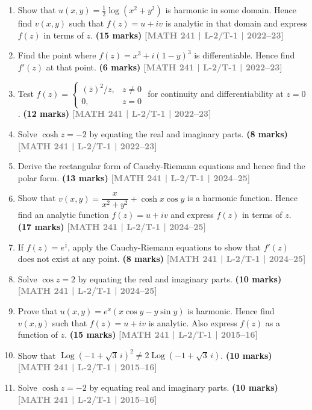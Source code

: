 \documentclass[12pt,a4paper]{article}
\newcommand{\yr}[1]{\hfill\textcolor{gray}{\small\textbf{[#1]}}}
\newcommand{\mk}[1]{\textcolor{orange!70!black}{\small\textbf{(#1 marks)}}}
\begin{document}
\begin{enumerate}
\item Show that $u(x,y)=\tfrac{1}{2}\log(x^{2}+y^{2})$ is harmonic in some domain. Hence find $v(x,y)$ such that $f(z)=u+iv$ is analytic in that domain and express $f(z)$ in terms of $z$.
\mk{15} \yr{MATH 241 | L-2/T-1 | 2022--23}

\item Find the point where $f(z)=x^{3}+i(1-y)^{3}$ is differentiable. Hence find $f'(z)$ at that point.
\mk{6} \yr{MATH 241 | L-2/T-1 | 2022--23}

\item Test $f(z)=\begin{cases}(\bar{z})^{2}/z, & z\neq 0\\ 0, & z=0\end{cases}$ for continuity and differentiability at $z=0$.
\mk{12} \yr{MATH 241 | L-2/T-1 | 2022--23}

\item Solve $\cosh z=-2$ by equating the real and imaginary parts.
\mk{8} \yr{MATH 241 | L-2/T-1 | 2022--23}

\item Derive the rectangular form of Cauchy-Riemann equations and hence find the polar form.
\mk{13} \yr{MATH 241 | L-2/T-1 | 2024--25}

\item Show that $v(x,y)=\dfrac{x}{x^{2}+y^{2}}+\cosh x\cos y$ is a harmonic function. Hence find an analytic function $f(z)=u+iv$ and express $f(z)$ in terms of $z$.
\mk{17} \yr{MATH 241 | L-2/T-1 | 2024--25}

\item If $f(z)=e^{\bar{z}}$, apply the Cauchy-Riemann equations to show that $f'(z)$ does not exist at any point.
\mk{8} \yr{MATH 241 | L-2/T-1 | 2024--25}

\item Solve $\cos z=2$ by equating the real and imaginary parts.
\mk{10} \yr{MATH 241 | L-2/T-1 | 2024--25}

\item Prove that $u(x,y)=e^{x}(x\cos y - y\sin y)$ is harmonic. Hence find $v(x,y)$ such that $f(z)=u+iv$ is analytic. Also express $f(z)$ as a function of $z$.
\mk{15} \yr{MATH 241 | L-2/T-1 | 2015--16}

\item Show that $\operatorname{Log}(-1+\sqrt{3}\,i)^{2}\neq 2\operatorname{Log}(-1+\sqrt{3}\,i)$.
\mk{10} \yr{MATH 241 | L-2/T-1 | 2015--16}

\item Solve $\cosh z=-2$ by equating real and imaginary parts.
\mk{10} \yr{MATH 241 | L-2/T-1 | 2015--16}


\end{enumerate}
\end{document}
